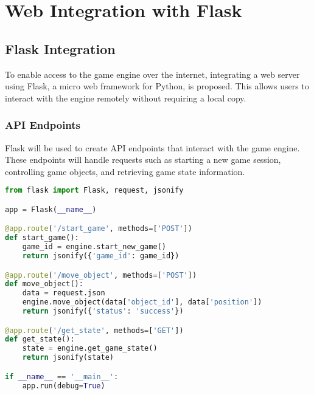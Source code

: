\pagebreak





\section*{Web Integration with Flask}

\subsection*{Flask Integration}

To enable access to the game engine over the internet, integrating a web server using Flask, a micro web framework for Python, is proposed. This allows users to interact with the engine remotely without requiring a local copy.

\subsubsection*{API Endpoints}

Flask will be used to create API endpoints that interact with the game engine. These endpoints will handle requests such as starting a new game session, controlling game objects, and retrieving game state information.

\begin{lstlisting}[caption={Flask API Endpoint Example}, language=Python]
from flask import Flask, request, jsonify

app = Flask(__name__)

@app.route('/start_game', methods=['POST'])
def start_game():
    game_id = engine.start_new_game()
    return jsonify({'game_id': game_id})

@app.route('/move_object', methods=['POST'])
def move_object():
    data = request.json
    engine.move_object(data['object_id'], data['position'])
    return jsonify({'status': 'success'})

@app.route('/get_state', methods=['GET'])
def get_state():
    state = engine.get_game_state()
    return jsonify(state)

if __name__ == '__main__':
    app.run(debug=True)
\end{lstlisting}




\pagebreak







